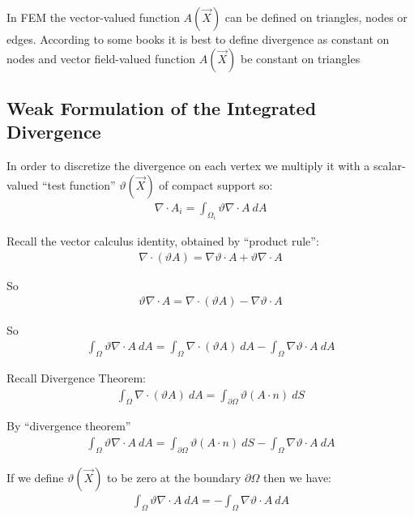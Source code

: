 \documentclass{birkjour}
\numberwithin{equation}{section}
\begin{document}
In FEM the vector-valued function $A(\vec X)$ can be defined on triangles, nodes or edges.
According to some books it is best to define divergence as constant on nodes and 
vector field-valued function $A(\vec X)$ be constant on triangles

\subsection{Weak Formulation of the Integrated Divergence}

In order to discretize the divergence on each vertex we multiply it with a scalar-valued “test function” $\vartheta(\vec X)$ of compact support so:
\begin{eqnarray}
	\nabla \cdot A_i = \int_{\Omega_i} {\vartheta \nabla \cdot A \  dA} \nonumber
\end{eqnarray}

Recall the vector calculus identity, obtained by ``product rule'':
\begin{eqnarray}
	\nabla \cdot (\vartheta A) = \nabla \vartheta \cdot A + \vartheta \nabla \cdot A \nonumber
\end{eqnarray}

So
\begin{eqnarray}
	\vartheta \nabla \cdot A  = \nabla \cdot (\vartheta A) - \nabla \vartheta \cdot A \nonumber
\end{eqnarray}

So
\begin{eqnarray}
	\int_{\Omega} {\vartheta \nabla \cdot A \ dA}  = \int_{\Omega} {\nabla \cdot (\vartheta A)  \ dA }- \int_{\Omega} { \nabla \vartheta \cdot A \ dA } \nonumber
\end{eqnarray}

Recall Divergence Theorem:
\begin{eqnarray}
	\int_{\Omega} {\nabla \cdot (\vartheta A)  \ dA }  = \int_{\partial \Omega} { \vartheta (A \cdot n) \ dS } \nonumber
\end{eqnarray}

By “divergence theorem”
\begin{eqnarray}
	\int_{\Omega} {\vartheta \nabla \cdot A \ dA}  = \int_{\partial \Omega} {\vartheta (A \cdot n) \ dS } - \int_{\Omega} { \nabla \vartheta \cdot A \ dA } \nonumber
\end{eqnarray}

If we define $\vartheta(\vec X)$ to be zero at the boundary $\partial \Omega$ then we have:
\begin{eqnarray}
	\int_{\Omega} {\vartheta \nabla \cdot A \ dA}  = - \int_{\Omega} { \nabla \vartheta \cdot A \ dA } \nonumber
\end{eqnarray}
\end{document}
